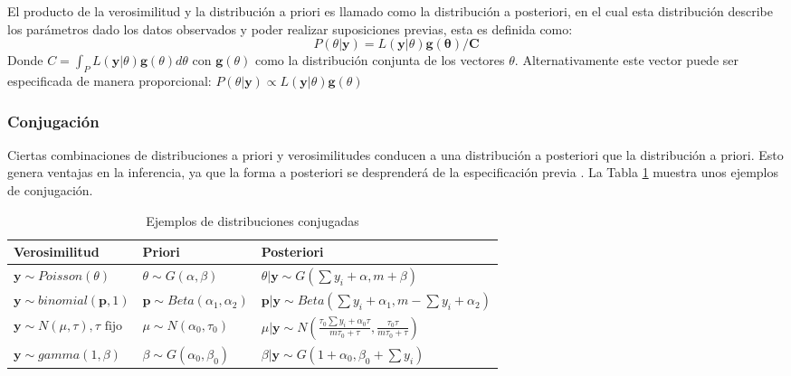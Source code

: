 El producto de la verosimilitud y la distribución a priori es llamado como la distribución a posteriori, en el cual esta distribución describe los parámetros dado los datos observados y poder realizar suposiciones previas, esta es definida como:
$$
P(\theta | \mathbf{y}) = L(\mathbf{y} | \theta)\mathbf{g(\theta)/C}
$$
Donde $C = \int_{P}^{}L(\mathbf{y}|\theta)\mathbf{g}(\theta)d\theta$ con $\mathbf{g}(\theta)$ como la distribución conjunta de los vectores $\theta$. Alternativamente este vector puede ser especificada de manera proporcional: $P(\theta | \mathbf{y}) \propto L (\mathbf{y} | \theta)\mathbf{g}(\theta)$

\subsubsection{Conjugación}
Ciertas combinaciones de distribuciones a priori y verosimilitudes conducen a una distribución a posteriori que la distribución a priori. Esto genera ventajas en la inferencia, ya que la forma a posteriori se desprenderá de la especificación previa \cite{lawson2018bayesian}. La Tabla \ref{tabla:distribuciones} muestra unos ejemplos de conjugación.

\begin{table}[htb]
\centering
\begin{tabular}{|p{4cm}|p{4cm}|p{7cm}|}
\hline
\textbf{Verosimilitud} & \textbf{Priori}& \textbf{Posteriori} \\ \hline
$\mathbf{y} \sim Poisson(\theta)$ & $\theta \sim G(\alpha, \beta)$ & $\theta|\mathbf{y} \sim G(\sum{y}_{i} + \alpha,m + \beta)$ \\
$\mathbf{y} \sim binomial(\mathbf{p},1)$ & $\mathbf{p} \sim Beta({\alpha}_{1}, {\alpha}_{2})$ & $\mathbf{p}|\mathbf{y} \sim Beta(\sum{y}_{i} + {\alpha}_{1},m - \sum {y}_{i} + {\alpha}_{2})$ \\
$\mathbf{y} \sim N(\mu, \tau), \tau \text{ fijo}$ & $\mu \sim N({\alpha}_{0}, {\tau}_{0})$ & $\mu|\mathbf{y} \sim N\left( \frac{{\tau}_{0}\sum {y}_{i} + {\alpha}_{0} \tau}{m {\tau}_{0} + \tau}, \frac{{\tau}_{0}\tau}{m{\tau}_{0}+\tau} \right)$ \\
$\mathbf{y} \sim gamma(1,\beta)$ & $\beta \sim G({\alpha}_{0}, {\beta}_{0})$ & $\beta|\mathbf{y} \sim G(1 + {\alpha}_{0}, {\beta}_{0} + \sum{y}_{i})$ \\
\hline
\end{tabular}
\caption{Ejemplos de distribuciones conjugadas}
\label{tabla:distribuciones}
\end{table}

